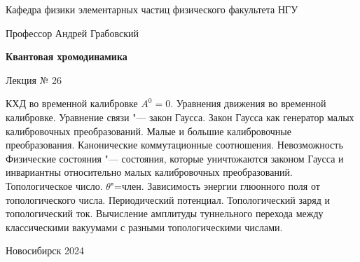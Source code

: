 \documentclass[12pt,pagesize,paper=landscape,paper=192mm:108mm]{scrbook}
\begin{document}
\begin{titlepage}
\begin{center}
    Кафедра физики элементарных частиц физического факультета НГУ

    \Large
    Профессор Андрей Грабовский
    

    \huge
    \textbf{Квантовая хромодинамика}

    \Large
    Лекция № 26
    \vfill

    \small
    \begin{minipage}{0.85\linewidth}
      КХД во временной калибровке $A^0=0$. Уравнения движения во
      временной калибровке. Уравнение связи "--- закон Гаусса. Закон
      Гаусса как генератор малых калибровочных преобразований. Малые и
      большие калибровочные преобразования. Канонические
      коммутационные соотношения. Невозможность Физические состояния "---
      состояния, которые уничтожаются законом Гаусса и инвариантны
      относительно малых калибровочных преобразований. Топологическое
      число. $\theta$"=член. Зависимость энергии глюонного поля от
      топологического числа. Периодический потенциал. Топологический
      заряд и топологический ток. Вычисление амплитуды туннельного
      перехода между классическими вакуумами с разными топологическими
      числами.
    \end{minipage}
    \vfill

    \normalsize \ccbysa\hspace{0.5em}  Новосибирск 2024
  \end{center}
\end{titlepage}
\end{document}
